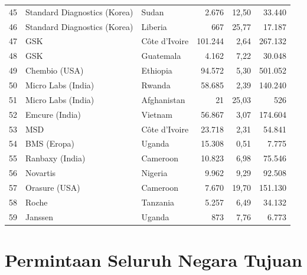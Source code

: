 \documentclass[a4paper,11pt]{article}
\begin{document}
{\begin{longtable}{@{}r l l r r r@{}}
45 & Standard Diagnostics (Korea) & Sudan & 2.676 & 12,50 & 33.440 \\
46 & Standard Diagnostics (Korea) & Liberia & 667 & 25,77 & 17.187 \\
47 & GSK & C\^ote d'Ivoire & 101.244 & 2,64 & 267.132 \\
48 & GSK & Guatemala & 4.162 & 7,22 & 30.048 \\
49 & Chembio (USA) & Ethiopia & 94.572 & 5,30 & 501.052 \\
50 & Micro Labs (India) & Rwanda & 58.685 & 2,39 & 140.240 \\
51 & Micro Labs (India) & Afghanistan & 21 & 25,03 & 526 \\
52 & Emcure (India) & Vietnam & 56.867 & 3,07 & 174.604 \\
53 & MSD & C\^ote d'Ivoire & 23.718 & 2,31 & 54.841 \\
54 & BMS (Eropa) & Uganda & 15.308 & 0,51 & 7.775 \\
55 & Ranbaxy (India) & Cameroon & 10.823 & 6,98 & 75.546 \\
56 & Novartis & Nigeria & 9.962 & 9,29 & 92.508 \\
57 & Orasure (USA) & Cameroon & 7.670 & 19,70 & 151.130 \\
58 & Roche & Tanzania & 5.257 & 6,49 & 34.132 \\
59 & Janssen & Uganda & 873 & 7,76 & 6.773 \\
\end{longtable}
}

\section{Permintaan Seluruh Negara Tujuan}\label{app:B}
\end{document}
